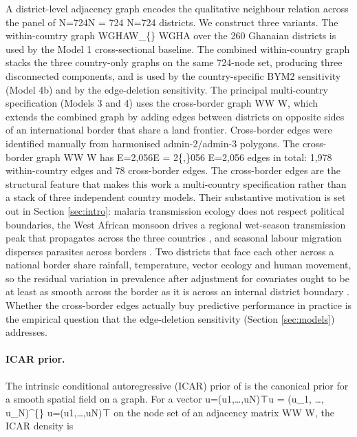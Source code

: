 \documentclass{article}
\begin{document}
A district-level adjacency graph encodes the qualitative neighbour
relation across the panel of N=724N = 724 N=724 districts. We construct
three variants. The within-country graph WGHAW\_\{\}
WGHA\hspace{0pt} over the 260 Ghanaian districts is used by the Model 1
cross-sectional baseline. The combined within-country graph stacks the
three country-only graphs on the same 724-node set, producing three
disconnected components, and is used by the country-specific BYM2
sensitivity (Model 4b) and by the edge-deletion sensitivity. The
principal multi-country specification (Models 3 and 4) uses the
cross-border graph WW W, which extends the combined graph by adding
edges between districts on opposite sides of an international border
that share a land frontier. Cross-border edges were identified manually
from harmonised admin-2/admin-3 polygons. The cross-border graph WW W
has E=2,056E = 2\{,\}056 E=2,056 edges in total: 1,978 within-country
edges and 78 cross-border edges. The cross-border edges are the
structural feature that makes this work a multi-country specification
rather than a stack of three independent country models. Their
substantive motivation is set out in Section \ref{sec:intro}: malaria
transmission ecology does not respect political boundaries, the West
African monsoon drives a regional wet-season transmission peak that
propagates across the three countries \citep{bhatt2015}, and seasonal
labour migration disperses parasites across borders \citep{gething2011}.
Two districts that face each other across a national border share
rainfall, temperature, vector ecology and human movement, so the
residual variation in prevalence after adjustment for covariates ought
to be at least as smooth across the border as it is across an internal
district boundary \citep{weiss2020}. Whether the cross-border edges
actually buy predictive performance in practice is the empirical
question that the edge-deletion sensitivity (Section \ref{sec:models})
addresses.

\paragraph{ICAR prior.}

The intrinsic conditional autoregressive (ICAR) prior of
\citep{besag1991} is the canonical prior for a smooth spatial field on a
graph. For a vector u=(u1,\ldots,uN)⊤u = (u\_1, \ldots,
u\_N)\^{}\{\top\} u=(u1\hspace{0pt},\ldots,uN\hspace{0pt})⊤ on the node
set of an adjacency matrix WW W, the ICAR density is
\end{document}
